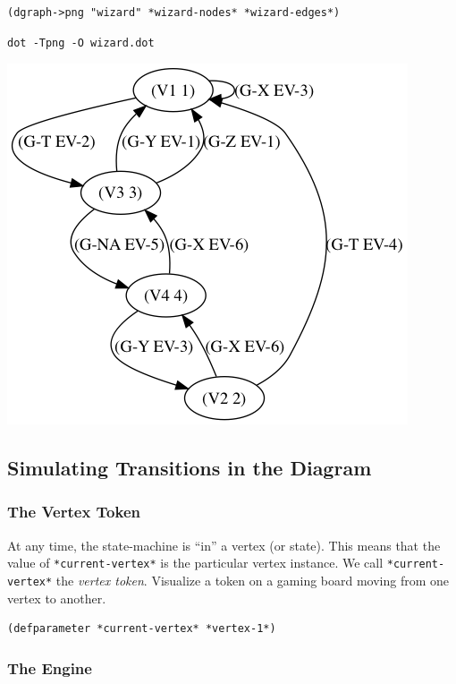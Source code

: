\documentclass[10pt,oneside,x11names]{article}
\begin{document}
\begin{verbatim}
(dgraph->png "wizard" *wizard-nodes* *wizard-edges*)
\end{verbatim}

\begin{verbatim}
dot -Tpng -O wizard.dot
\end{verbatim}
\begin{center}
\includegraphics[width=.9\linewidth]{wizard.dot.png}
\end{center}

\subsection{Simulating Transitions in the Diagram}
\label{sec:org63d057b}

\subsubsection{The Vertex Token}
\label{sec:org24eb634}

At any time, the state-machine is ``in'' a vertex (or state). This means that
the value of \texttt{*current-vertex*} is the particular vertex instance. We call
\texttt{*current-vertex*} the \emph{vertex token}. Visualize a token on a gaming board
moving from one vertex to another.

\begin{verbatim}
(defparameter *current-vertex* *vertex-1*)
\end{verbatim}

\subsubsection{The Engine}
\label{sec:orgc5fe0b9}
\end{document}
